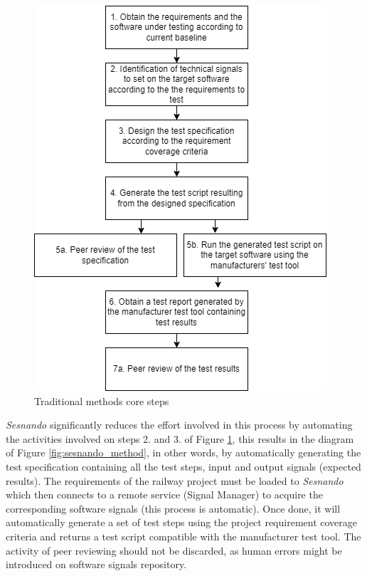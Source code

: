\begin{figure}[p]
    \centering
    \includegraphics[scale=0.9]{images/traditional_methods.png}
    \caption{Traditional methods core steps}
    \label{fig:traditional_method}
\end{figure}

\textit{Sesnando} significantly reduces the effort involved in this process by automating the activities involved on steps 2. and 3. of Figure \ref{fig:traditional_method}, this results in the diagram of Figure \ref{fig:sesnando_method}, in other words, by automatically generating the test specification containing all the test steps, input and output signals (expected results). The requirements of the railway project must be loaded to \textit{Sesnando} which then connects to a remote service (Signal Manager) to acquire the corresponding software signals (this process is automatic). Once done, it will automatically generate a set of test steps using the project requirement coverage criteria and returns a test script compatible with the manufacturer test tool. The activity of peer reviewing should not be discarded, as human errors might be introduced on software signals repository.\\

